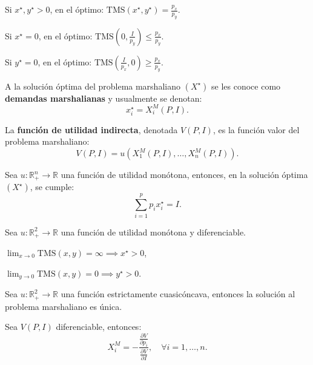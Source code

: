\documentclass[8pt,a4paper]{extarticle}
\begin{document}
\begin{multicols}{3}
\begin{bulletlist}
\item Si $x^\star, y^\star > 0$, en el óptimo: $\displaystyle \text{TMS} (x^\star, y^\star) = \frac{p_x}{p_y}$.
\item Si $x^\star = 0$, en el óptimo: $\displaystyle \text{TMS} \left(0, \frac{I}{p_y}\right) \le \frac{p_x}{p_y}$.
\item Si $y^\star = 0$, en el óptimo: $\displaystyle \text{TMS} \left(\frac{I}{p_x}, 0\right) \ge \frac{p_x}{p_y}$.
\end{bulletlist}

\begin{boxdef}
A la solución óptima del problema marshaliano $(X^\star)$ se les conoce como \textbf{demandas marshalianas} y usualmente se denotan:
\[
	x_i^\star = X_i^M (P, I)
.\] 
\end{boxdef}

\begin{boxdef}
	La \textbf{función de utilidad indirecta}, denotada $V(P, I)$, es la función valor del problema marshaliano:
	\[
		V(P, I) = u(X_1^M(P, I), \ldots, X_n^M(P, I))
	.\] 
\end{boxdef}

\begin{boxtheo}
	Sea $u : \mathbb{R}^n_+ \to \mathbb{R}$ una función de utilidad monótona, entonces, en la solución óptima $(X^\star)$, se cumple:
	\[
	\sum_{i=1}^{p} p_i x_i^\star = I
	.\] 
\end{boxtheo}

\begin{boxtheo}
	Sea $u : \mathbb{R}^2_+ \to \mathbb{R}$ una función de utilidad monótona y diferenciable.
	\begin{eqlist}
	\item $\displaystyle \lim_{x \to 0} \text{TMS} (x, y) = \infty \implies x^\star > 0$,
	\item $\displaystyle \lim_{y \to 0} \text{TMS} (x, y) = 0 \implies y^\star > 0$.
	\end{eqlist}
\end{boxtheo}

\begin{boxtheo}
	Sea $u : \mathbb{R}^2_+ \to \mathbb{R}$ una función estrictamente cuasicóncava, entonces la solución al problema marshaliano es única.
\end{boxtheo}

\begin{boxlemma}
	Sea $V(P, I)$ diferenciable, entonces:
	\[
	X^M_i = - \frac{\displaystyle \frac{\partial V}{\partial p_{i}}}{ \displaystyle \frac{\partial V}{\partial I}}, \quad \forall i = 1, \ldots, n
	.\] 
\end{boxlemma}


\end{multicols}
\end{document}
